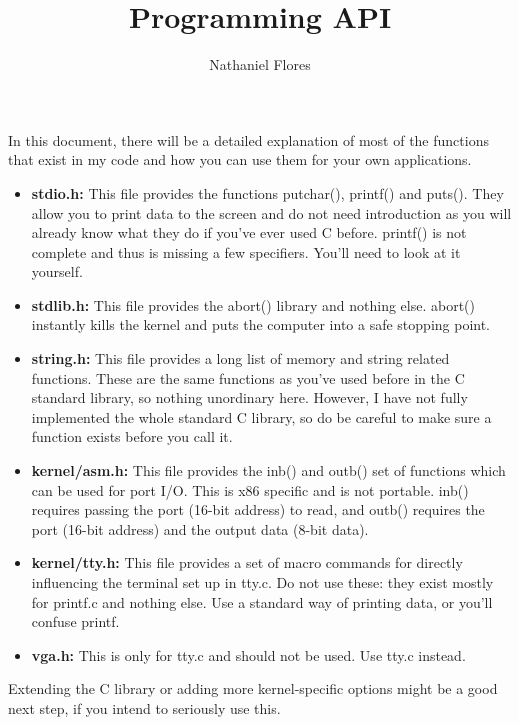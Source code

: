 \documentclass[a4paper,10pt]{article}
\title{Programming API}
\author{Nathaniel Flores}
\begin{document}
\maketitle
In this document, there will be a detailed explanation of most of the functions that exist in my code and how you can use them for your own applications.
\begin{itemize}
\item \textbf{stdio.h:} This file provides the functions putchar(), printf() and puts(). They allow you to print data to the screen and do not need introduction as you will already know what they do if you've ever used C before. printf() is not complete and thus is missing a few specifiers. You'll need to look at it yourself.
\item \textbf{stdlib.h:} This file provides the abort() library and nothing else. abort() instantly kills the kernel and puts the computer into a safe stopping point.
\item \textbf{string.h:} This file provides a long list of memory and string related functions. These are the same functions as you've used before in the C standard library, so nothing unordinary here. However, I have not fully implemented the whole standard C library, so do be careful to make sure a function exists before you call it.
\item \textbf{kernel/asm.h:} This file provides the inb() and outb() set of functions which can be used for port I/O. This is x86 specific and is not portable. inb() requires passing the port (16-bit address) to read, and outb() requires the port (16-bit address) and the output data (8-bit data).
\item \textbf{kernel/tty.h:} This file provides a set of macro commands for directly influencing the terminal set up in tty.c. Do not use these: they exist mostly for printf.c and nothing else. Use a standard way of printing data, or you'll confuse printf.
  \item \textbf{vga.h:} This is only for tty.c and should not be used. Use tty.c instead.
\end{itemize}
Extending the C library or adding more kernel-specific options might be a good next step, if you intend to seriously use this.
\end{document}
